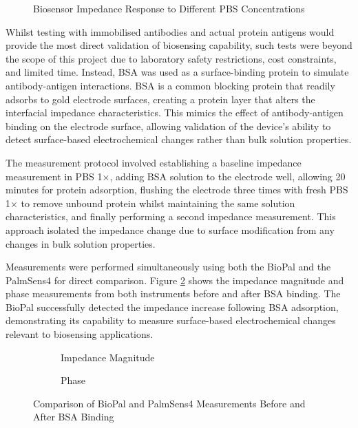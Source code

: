 \begin{figure}[H]
    \centering
    \caption{Biosensor Impedance Response to Different PBS Concentrations}
    \label{fig:pbs_concentrations}
\end{figure}

Whilst testing with immobilised antibodies and actual protein antigens would provide the most direct validation of biosensing capability, such tests were beyond the scope of this project due to laboratory safety restrictions, cost constraints, and limited time. Instead, BSA was used as a surface-binding protein to simulate antibody-antigen interactions. BSA is a common blocking protein that readily adsorbs to gold electrode surfaces, creating a protein layer that alters the interfacial impedance characteristics. This mimics the effect of antibody-antigen binding on the electrode surface, allowing validation of the device's ability to detect surface-based electrochemical changes rather than bulk solution properties.

The measurement protocol involved establishing a baseline impedance measurement in PBS 1×, adding BSA solution to the electrode well, allowing 20 minutes for protein adsorption, flushing the electrode three times with fresh PBS 1× to remove unbound protein whilst maintaining the same solution characteristics, and finally performing a second impedance measurement. This approach isolated the impedance change due to surface modification from any changes in bulk solution properties.

Measurements were performed simultaneously using both the BioPal and the PalmSens4 for direct comparison. Figure \ref{fig:bsa_comparison} shows the impedance magnitude and phase measurements from both instruments before and after BSA binding. The BioPal successfully detected the impedance increase following BSA adsorption, demonstrating its capability to measure surface-based electrochemical changes relevant to biosensing applications.

\begin{figure}[H]
    \centering
    \begin{subfigure}{0.45\textwidth}
        \centering
        \caption{Impedance Magnitude}
    \end{subfigure}
    \hfill
    \begin{subfigure}{0.45\textwidth}
        \centering
        \caption{Phase}
    \end{subfigure}
    \caption{Comparison of BioPal and PalmSens4 Measurements Before and After BSA Binding}
    \label{fig:bsa_comparison}
\end{figure}

